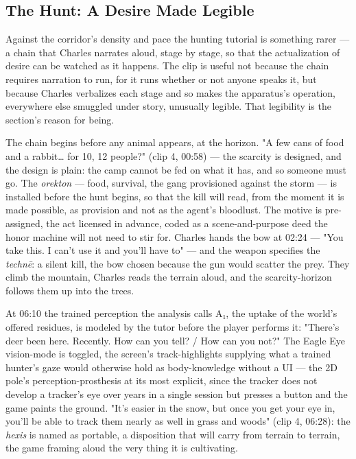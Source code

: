 \documentclass{article}
\begin{document}
\bigskip

\subsection*{The Hunt: A Desire Made Legible}

Against the corridor's density and pace the hunting tutorial is something rarer — a chain that Charles narrates aloud, stage by stage, so that the actualization of desire can be watched as it happens. The clip is useful not because the chain requires narration to run, for it runs whether or not anyone speaks it, but because Charles verbalizes each stage and so makes the apparatus's operation, everywhere else smuggled under story, unusually legible. That legibility is the section's reason for being.

The chain begins before any animal appears, at the horizon. "A few cans of food and a rabbit… for 10, 12 people?" (clip 4, 00:58) — the scarcity is designed, and the design is plain: the camp cannot be fed on what it has, and so someone must go. The \textit{orekton} — food, survival, the gang provisioned against the storm — is installed before the hunt begins, so that the kill will read, from the moment it is made possible, as provision and not as the agent's bloodlust. The motive is pre-assigned, the act licensed in advance, coded as a scene-and-purpose deed the honor machine will not need to stir for. Charles hands the bow at 02:24 — "You take this. I can't use it and you'll have to" — and the weapon specifies the \textit{technē}: a silent kill, the bow chosen because the gun would scatter the prey. They climb the mountain, Charles reads the terrain aloud, and the scarcity-horizon follows them up into the trees.

At 06:10 the trained perception the analysis calls A₁, the uptake of the world's offered residues, is modeled by the tutor before the player performs it: "There's deer been here. Recently. How can you tell? / How can you not?" The Eagle Eye vision-mode is toggled, the screen's track-highlights supplying what a trained hunter's gaze would otherwise hold as body-knowledge without a UI — the 2D pole's perception-prosthesis at its most explicit, since the tracker does not develop a tracker's eye over years in a single session but presses a button and the game paints the ground. "It's easier in the snow, but once you get your eye in, you'll be able to track them nearly as well in grass and woods" (clip 4, 06:28): the \textit{hexis} is named as portable, a disposition that will carry from terrain to terrain, the game framing aloud the very thing it is cultivating.
\end{document}
